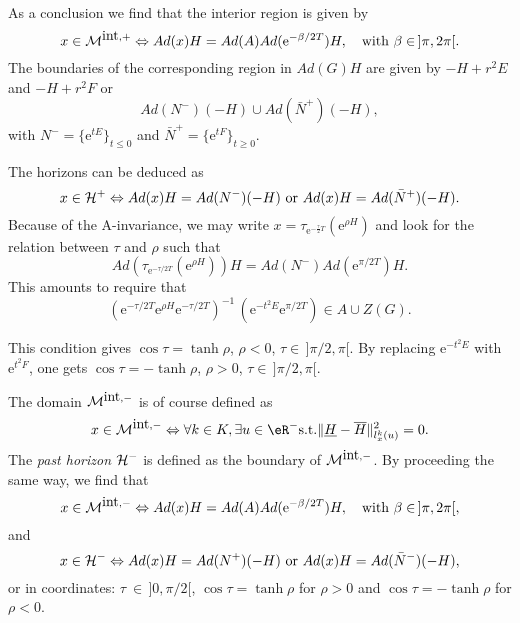  As a conclusion we find that the interior region is given by
 \begin{equation}
x \in {\cal M}^{\mbox{int},+} \Leftrightarrow Ad(x)H =
Ad(A)Ad(\mbox{e}^{-\beta/2 T})H, \quad \mbox{with} \,\,
\beta \in \, ]\pi , 2\pi[.
\end{equation}
The boundaries of the corresponding region in $Ad(G)H$ are given by $-H + r^2 E$ and $-H + r^2 F$ or
\begin{equation}
 Ad(N^-)(-H) \cup  Ad(\bar{N}^+)(-H),
 \end{equation}
 with $N^- = \{\mbox{e}^{tE}\}_{t\leq 0}$ and $\bar{N}^+ = \{\mbox{e}^{tF}\}_{t\geq 0}$.

The horizons can be deduced as
\begin{equation}
 x \in {\cal H^+} \Leftrightarrow Ad(x)H = Ad(N^-)(-H) \,\,
 \mbox{or} \,\, Ad(x)H = Ad(\bar{N}^+)(-H).
 \end{equation}
Because of the A-invariance, we may write $x=\tau_{\mbox{e}^{-\frac{\tau}{2} T}}(\mbox{e}^{\rho H})$ and look for the relation between $\tau$ and $\rho$ such that
\begin{equation}
 Ad(\tau_{\mbox{e}^{-\tau/2
T}}(\mbox{e}^{\rho H}))H = Ad(N^-)Ad(\mbox{e}^{\pi/2 T}) H.
\end{equation}
This amounts to require that
\begin{equation}\label{CondHor}
 \left(\mbox{e}^{-\tau/2 T} \mbox{e}^{\rho H} \mbox{e}^{-\tau/2 T}\right)^{-1} \,
 (\mbox{e}^{-t^2 E} \mbox{e}^{\pi/2 T}) \in A \cup Z(G).
 \end{equation}

This condition gives $\cos\tau = \tanh \rho$, $\rho<0$, $\tau\in \, ]\pi/2,\pi[$. By replacing $\mbox{e}^{-t^2 E}$ with $\mbox{e}^{t^2 F}$, one gets $\cos\tau = -\tanh \rho$, $\rho>0$, $\tau\in \, ]\pi/2,\pi[$.

The domain ${\cal M}^{\mbox{int},-}$ is of course defined as
\begin{equation}\label{interior}
 x \in {\cal M}^{\mbox{int},-} \Leftrightarrow \forall k \in K, \exists u \in
 \eR^-  \mbox{s.t.}  \|\underline{H} - \overline{H}\|^2_{l^k_x (u)}=0.
 \end{equation}
The \emph{past horizon} ${\cal H^-}$ is defined as the boundary of ${\cal M}^{\mbox{int},-}$. By proceeding the same way, we find that
\begin{equation}
x \in {\cal M}^{\mbox{int},-} \Leftrightarrow Ad(x)H =
Ad(A)Ad(\mbox{e}^{-\beta/2 T})H, \quad \mbox{with} \,\,
\beta \in \, ]\pi,2 \pi[,
\end{equation}
and
\begin{equation}
 x \in {\cal H^-} \Leftrightarrow Ad(x)H = Ad(N^+)(-H) \,\,
 \mbox{or} \,\, Ad(x)H = Ad(\bar{N}^-)(-H),
 \end{equation}
or in coordinates: $\tau\ \in \, ]0,\pi/2[$, $\cos \tau = \tanh \rho$ for $\rho > 0$ and $\cos \tau =-\tanh \rho$ for $\rho < 0$.

